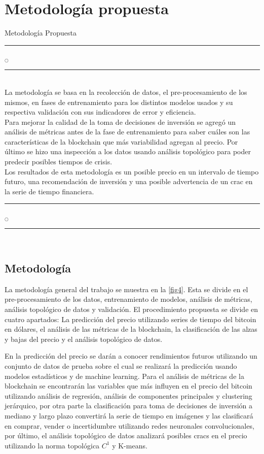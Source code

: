 \chapter[Metodología]{Metodología propuesta}{Metodología Propuesta}\label{Metodologia}

\noindent
\rule{0.49\textwidth}{0.75pt} $_{\bigcirc}$ \rule{0.49\textwidth}{0.75pt}\\

La metodología se basa en la recolección de datos, el pre-procesamiento de los mismos, en fases de entrenamiento para los distintos modelos usados y su respectiva validación con sus indicadores de error y eficiencia.\\
Para mejorar la calidad de la toma de decisiones de inversión se agregó un análisis de métricas antes de la fase de entrenamiento para saber cuáles son las características de la blockchain que más variabilidad agregan al precio. Por último se hizo una inspección a los datos usando análisis topológico para poder predecir posibles tiempos de crisis.\\
Los resultados de esta metodología es un posible precio en un intervalo de tiempo futuro, una recomendación de inversión y una posible advertencia de un crac en la serie de tiempo financiera.\\

\noindent
\rule{0.49\textwidth}{0.75pt} $_{\bigcirc}$ \rule{0.49\textwidth}{0.75pt}\\
\clearpage

\section{Metodología}
La metodología general del trabajo se muestra en la \cref{fig4}. Esta se divide en el pre-procesamiento de los datos, entrenamiento de modelos, análisis de métricas, análisis topológico de datos y validación.
El procedimiento propuesta se divide en cuatro apartados: La predicción del precio utilizando series de tiempo del bitcoin en dólares, el análisis de las métricas de la blockchain, la clasificación de las alzas y bajas del precio y el análisis topológico de datos.
 
En la predicción del precio se darán a conocer rendimientos futuros utilizando un conjunto de datos de prueba sobre el cual se realizará la predicción usando modelos estadísticos y de machine learning. Para el análisis de métricas de la blockchain se encontrarán las variables que más influyen en el precio del bitcoin utilizando análisis de regresión, análisis de componentes principales y clustering jerárquico, por otra parte la clasificación para toma de decisiones de inversión a mediano y largo plazo convertirá la serie de tiempo en imágenes y las clasificará en comprar, vender o incertidumbre utilizando redes neuronales convolucionales, por último, el análisis topológico de datos analizará posibles cracs en el precio utilizando la norma topológica $C^1$ y K-means. 
\vspace{-0.59cm}
